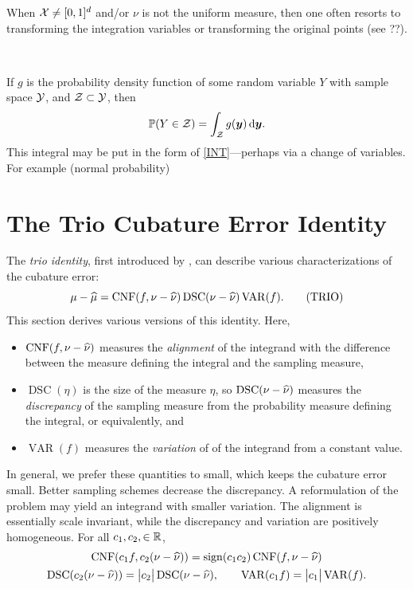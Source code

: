 \documentclass[graybox,footinfo]{svmult}
\DeclareMathOperator{\algn}{CNF}
\DeclareMathOperator{\disc}{DSC}
\DeclareMathOperator{\Var}{VAR}
\DeclareMathOperator{\sign}{sign}
\begin{document}
When $\mathcal{X} \ne [0,1]^d$ and/or $\nu$ is not the uniform 
measure, then one often resorts to transforming the integration variables or transforming 
the original points (see ??).


\


\begin{example} \label{MultivarProbA} If $g$ is the probability density function of some random variable $Y$ with sample space $\mathcal{Y}$, and $\mathcal{Z} \subset \mathcal{Y}$, then 
\[
\mathbb{P}(Y \in \mathcal{Z}) = \int_{\mathcal{Z}} g({\boldsymbol{y}}) \, \mathrm{d} {\boldsymbol{y}}.
\]
This integral may be put in the form of \eqref{INT}---perhaps via a change of variables.  
For example (normal probability)
\end{example}

\begin{example}
\end{example}

\begin{example}
\end{example}



\section{The Trio Cubature Error Identity}
The \emph{trio identity}, first introduced by  \cite{Meng}, can describe various characterizations of the cubature error:
\begin{equation}
\mu - \hmu = \algn(f,\nu - \hnu) \disc(\nu - \hnu)  \Var(f). \label{trio}\tag{TRIO}
\end{equation}
This section derives various versions of this identity.  Here,
\begin{itemize}
\item $\algn(f,\nu - \hnu)$ measures the \emph{alignment} of the integrand with the difference between the measure defining the integral and the sampling measure,
\item $\disc(\eta)$ is the size of the measure $\eta$, so $\disc(\nu - \hnu)$ measures the \emph{discrepancy} of the sampling measure from the probability measure defining the integral, or equivalently,  and 
\item $\Var(f)$ measures the \emph{variation} of of the integrand from a constant value.
\end{itemize}
In general, we prefer these quantities to small, which keeps the cubature error small.  Better sampling schemes decrease the discrepancy.  A reformulation of the problem may yield an integrand with smaller variation.  The alignment is essentially scale invariant, while the discrepancy and variation are positively homogeneous.  For all $c_1, c_2, \in {\mathbb{R}}$,
\begin{gather*}
\algn(c_1f,c_2(\nu - \hnu)) =  \sign(c_1 c_2) \algn(f,\nu - \hnu) \\
\disc(c_2(\nu-\hnu))  = \abs{c_2} \disc(\nu-\hnu), \qquad  \Var(c_1f) =  \abs{c_1}\Var(f).
\end{gather*}
\end{document}
